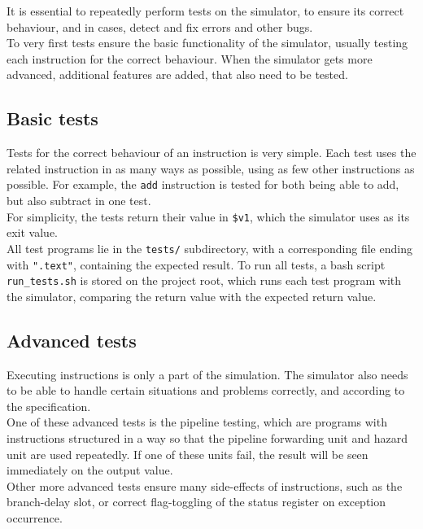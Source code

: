It is essential to repeatedly perform tests on the simulator, to ensure its
correct behaviour, and in cases, detect and fix errors and other bugs.\\
To very first tests ensure the basic functionality of the simulator, usually
testing each instruction for the correct behaviour. When the simulator gets more
advanced, additional features are added, that also need to be tested.

\subsection{Basic tests}
Tests for the correct behaviour of an instruction is very simple. Each test uses
the related instruction in as many ways as possible, using as few other
instructions as possible. For example, the \texttt{add} instruction is tested
for both being able to add, but also subtract in one test.\\
For simplicity, the tests return their value in \texttt{\$v1}, which the
simulator uses as its exit value.\\
All test programs lie in the \texttt{tests/} subdirectory, with a corresponding
file ending with \texttt{".text"}, containing the expected result.
To run all tests, a bash script \texttt{run\_tests.sh} is stored on the project
root, which runs each test program with the simulator, comparing the return
value with the expected return value.

\subsection{Advanced tests}
Executing instructions is only a part of the simulation. The simulator also
needs to be able to handle certain situations and problems correctly, and
according to the specification.\\
One of these advanced tests is the pipeline testing, which are programs
with instructions structured in a way so that the pipeline forwarding unit and
hazard unit are used repeatedly. If one of these units fail, the result will be
seen immediately on the output value.\\
Other more advanced tests ensure many side-effects of instructions, such as the
branch-delay slot, or correct flag-toggling of the status register on exception
occurrence.

